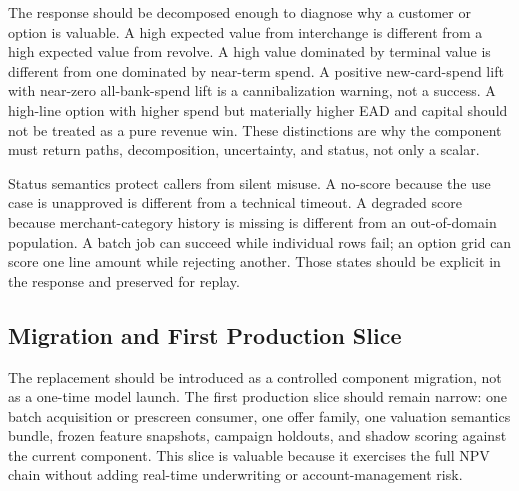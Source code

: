 \documentclass[11pt]{article}
\newcommand{\1}{\mathbf{1}}
\begin{document}
The response should be decomposed enough to diagnose why a customer or option
is valuable. A high expected value from interchange is different from a high
expected value from revolve. A high value dominated by terminal value is
different from one dominated by near-term spend. A positive new-card-spend
lift with near-zero all-bank-spend lift is a cannibalization warning, not a
success. A high-line option with higher spend but materially higher EAD and
capital should not be treated as a pure revenue win. These distinctions are
why the component must return paths, decomposition, uncertainty, and status,
not only a scalar.

Status semantics protect callers from silent misuse. A no-score because the
use case is unapproved is different from a technical timeout. A degraded score
because merchant-category history is missing is different from an
out-of-domain population. A batch job can succeed while individual rows fail;
an option grid can score one line amount while rejecting another. Those states
should be explicit in the response and preserved for replay.

\subsection{Migration and First Production Slice}
\label{sec:main-governance-migration}

The replacement should be introduced as a controlled component migration, not
as a one-time model launch. The first production slice should remain narrow:
one batch acquisition or prescreen consumer, one offer family, one valuation
semantics bundle, frozen feature snapshots, campaign holdouts, and shadow
scoring against the current component. This slice is valuable because it
exercises the full NPV chain without adding real-time underwriting or
account-management risk.
\end{document}
